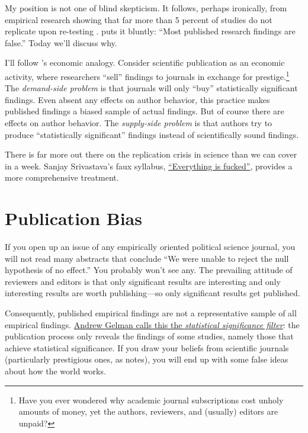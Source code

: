 \documentclass[12pt,oneside,openany]{book}
\let\rmarkdownfootnote\footnote%
\def\footnote{\protect\rmarkdownfootnote}
\begin{document}
My position is not one of blind skepticism. It follows, perhaps
ironically, from empirical research showing that far more than 5 percent
of studies do not replicate upon re-testing \citep{open2015estimating}.
\citet{ioannidis2005most} puts it bluntly: ``Most published research
findings are false.'' Today we'll discuss why.

I'll follow \citet{young2008current}'s economic analogy. Consider
scientific publication as an economic activity, where researchers
``sell'' findings to journals in exchange for prestige.\footnote{Have
  you ever wondered why academic journal subscriptions cost unholy
  amounts of money, yet the authors, reviewers, and (usually) editors
  are unpaid?} The \emph{demand-side problem} is that journals will only
``buy'' statistically significant findings. Even absent any effects on
author behavior, this practice makes published findings a biased sample
of actual findings. But of course there are effects on author behavior.
The \emph{supply-side problem} is that authors try to produce
``statistically significant'' findings instead of scientifically sound
findings.

There is far more out there on the replication crisis in science than we
can cover in a week. Sanjay Srivastava's faux syllabus,
\href{https://hardsci.wordpress.com/2016/08/11/everything-is-fucked-the-syllabus/}{``Everything
is fucked''}, provides a more comprehensive treatment.

\section{Publication Bias}\label{publication-bias}

If you open up an issue of any empirically oriented political science
journal, you will not read many abstracts that conclude ``We were unable
to reject the null hypothesis of no effect.'' You probably won't see
any. The prevailing attitude of reviewers and editors is that only
significant results are interesting and only interesting results are
worth publishing---so only significant results get published.

Consequently, published empirical findings are not a representative
sample of all empirical findings.
\href{http://andrewgelman.com/2011/09/10/the-statistical-significance-filter/}{Andrew
Gelman calls this the \emph{statistical significance filter}}: the
publication process only reveals the findings of some studies, namely
those that achieve statistical significance. If you draw your beliefs
from scientific journals (particularly prestigious ones, as
\citet{ioannidis2008most} notes), you will end up with some false ideas
about how the world works.
\end{document}
